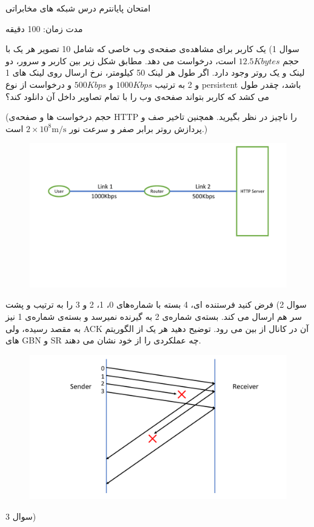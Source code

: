 \documentclass[10pt,letterpaper]{article}
\begin{document}
\Large
\begin{center}
امتحان پایانترم درس شبکه های مخابراتی

مدت زمان: 100 دقیقه

\hrulefill
\end{center}
سوال 1) یک کاربر برای مشاهده‌ی صفحه‌ی وب خاصی که شامل 10 تصویر هر یک با حجم 
$
12.5Kbytes
$
است، درخواست می دهد. مطابق شکل زیر بین کاربر و سرور، دو لینک و یک روتر وجود دارد. اگر طول هر لینک 50 کیلومتر، نرخ ارسال روی لینک های 1 و 2 به ترتیب 
$
1000 Kbps
$
 و
$
500 Kbps
$
و درخواست از نوع 
persistent
باشد، چقدر طول می کشد که کاربر بتواند صفحه‌ی وب را با تمام تصاویر داخل آن دانلود کند؟

(حجم درخواست ها و صفحه‌ی HTTP را ناچیز در نظر بگیرید. همچنین تاخیر صف و پردازش روتر برابر صفر و سرعت نور 
$
2\times 10^8 \text{m/s}
$
است.)
\begin{figure}[htb]
\centering
\includegraphics[width=160mm]{http.pdf}
\end{figure}
\newpage
سوال 2) فرض کنید فرستنده ای، 4 بسته با شماره‌های 0، 1، 2 و 3 را به ترتیب و پشت سر هم ارسال می کند. بسته‌ی شماره‌ی 2 به گیرنده نمیرسد و بسته‌ی شماره‌ی 1 نیز به مقصد رسیده، ولی ACK آن در کانال از بین می رود. توضیح دهید هر یک از الگوریتم های 
GBN
و
SR
چه عملکردی را از خود نشان می دهند.
\begin{figure}[htb]
\centering
\includegraphics[width=160mm]{gbn_sr.pdf}
\end{figure}
\newpage
سوال 3) 
\end{document}

